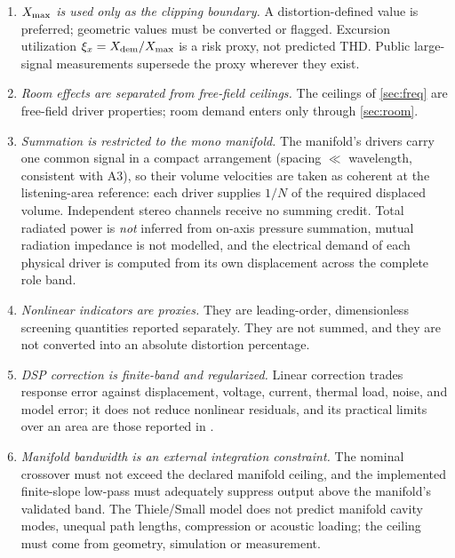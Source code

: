 \begin{enumerate}
\item[A7.] \emph{$X_{\mathrm{max}}$ is used only as the clipping boundary.} A
	distortion-defined value \cite{iec62458,klippel2003xmax} is preferred;
	geometric values must be converted or flagged. Excursion utilization
	$\xi_x=X_{\mathrm{dem}}/X_{\mathrm{max}}$ is a risk proxy, not predicted THD.
	Public large-signal measurements supersede the proxy wherever they
	exist.

\item[A8.] \emph{Room effects are separated from free-field ceilings.} The
	ceilings of \cref{sec:freq} are free-field driver properties; room
	demand enters only through \cref{sec:room}.

\item[A9.] \emph{Summation is restricted to the mono manifold.} The
	manifold's drivers carry one common signal in a compact arrangement
	(spacing $\ll$ wavelength, consistent with A3), so their volume
	velocities are taken as coherent at the listening-area reference: each
	driver supplies $1/N$ of the required displaced volume. Independent
	stereo channels receive no summing credit. Total radiated power is
	\emph{not} inferred from on-axis pressure summation, mutual radiation
	impedance is not modelled, and the electrical demand of each physical
	driver is computed from its own displacement across the complete role
	band.

\item[A10.] \emph{Nonlinear indicators are proxies.} They are
	leading-order, dimensionless screening quantities reported separately.
	They are not summed, and they are not converted into an absolute
	distortion percentage.

\item[A11.] \emph{DSP correction is finite-band and regularized.} Linear
	correction trades response error against displacement, voltage, current,
	thermal load, noise, and model error; it does not reduce nonlinear
	residuals, and its practical limits over an area are those reported in
	\cite{makivirta2003,cecchi2018}.

\item[A12.] \emph{Manifold bandwidth is an external integration
	constraint.} The nominal crossover must not exceed the declared
	manifold ceiling, and the implemented finite-slope low-pass must
	adequately suppress output above the manifold's validated band. The
	Thiele/Small model does not predict manifold cavity modes, unequal path
	lengths, compression or acoustic loading; the ceiling must come from
	geometry, simulation or measurement.
\end{enumerate}


